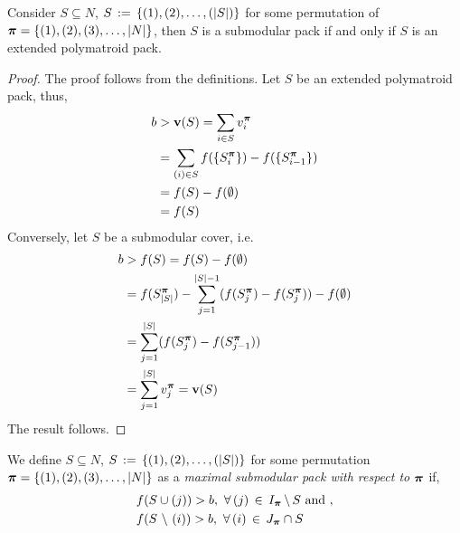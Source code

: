 \documentclass[10pt,twoside]{amsart}
\begin{document}
\begin{prop}
  Consider $S\subseteq N$, $S \,:=\, \{(1), (2), \ldots, (|S|)\}$ for some permutation of $\boldsymbol\pi = \{(1), (2), (3),\ldots, |N|\}$, then $S$ is a submodular pack if and only if $S$ is an extended polymatroid pack.
\end{prop}
\begin{proof}
  The proof follows from the definitions.
  Let $S$ be an extended polymatroid pack, thus,
  \begin{align*}
    b & > \mathbf{v}(S) = \sum_{i\in S} v^{\boldsymbol\pi}_{i}\\
      & = \sum_{(i)\in S} f(\{S^{\boldsymbol\pi}_i\}) - f(\{S^{\boldsymbol\pi}_{i-1}\})\\
      & = f(S) - f(\emptyset)\\
      & = f(S)
  \end{align*}
  Conversely, let $S$ be a submodular cover, i.e.
  \begin{align*}
    b & > f(S) = f(S) - f(\emptyset)\\
      & = f(S^{\boldsymbol\pi}_{|S|}) - \sum_{j = 1}^{|S|-1}(f(S^{\boldsymbol\pi}_{j}) - f(S^{\boldsymbol\pi}_{j})) - f(\emptyset)\\
      & = \sum_{j = 1}^{|S|}(f(S^{\boldsymbol\pi}_{j}) - f(S^{\boldsymbol\pi}_{j-1}))\\
      & = \sum_{j = 1}^{|S|} v^{\boldsymbol\pi}_j = \mathbf{v}(S)
  \end{align*}
  The result follows.
\end{proof}

\begin{dfn}
We define $S\subseteq N$, $S \,:=\, \{(1), (2), \ldots, (|S|)\}$ for some permutation $\boldsymbol\pi = \{(1), (2), (3),\ldots, |N|\}$ as a \emph{maximal submodular pack with respect to $\boldsymbol\pi$} if,
  \begin{align*}
    & f(S\cup (j)) > b,\,\,\forall\,(j) \,\in\, I_{\boldsymbol\pi}\,\backslash\, S \text{   and },\\
    & f(S\,\,\backslash\,\, (i)) > b,\,\,\forall\,(i) \,\in\, J_{\boldsymbol\pi} \cap S
  \end{align*}
\end{dfn}
\end{document}
